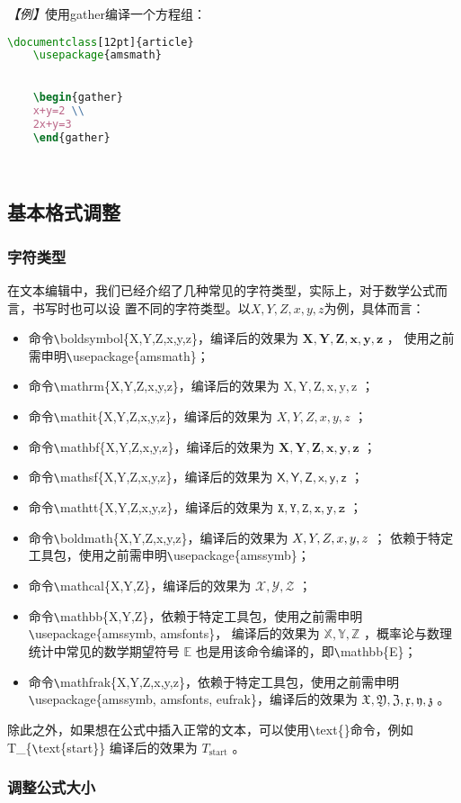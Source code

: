 \emph{【例】}使用gather编译一个方程组：
\begin{lstlisting}[language=TeX]
    \documentclass[12pt]{article}
    \usepackage{amsmath}
    

    \begin{gather}
    x+y=2 \\
    2x+y=3
    \end{gather}

    
\end{lstlisting}

\subsection{基本格式调整}
\subsubsection{字符类型}
在文本编辑中，我们已经介绍了几种常见的字符类型，实际上，对于数学公式而言，书写时也可以设
置不同的字符类型。以$X,Y,Z,x,y,z$为例，具体而言：
\begin{itemize}
    \item 命令\verb|\|boldsymbol\{X,Y,Z,x,y,z\}，编译后的效果为 $\boldsymbol{X,Y,Z,x,y,z}$ ，
          使用之前需申明\verb|\|usepackage\{amsmath\}；
    \item 命令\verb|\|mathrm\{X,Y,Z,x,y,z\}，编译后的效果为 $\mathrm{X,Y,Z,x,y,z}$ ；
    \item 命令\verb|\|mathit\{X,Y,Z,x,y,z\}，编译后的效果为 $\mathit{X,Y,Z,x,y,z}$ ；
    \item 命令\verb|\|mathbf\{X,Y,Z,x,y,z\}，编译后的效果为 $\mathbf{X,Y,Z,x,y,z}$ ；
    \item 命令\verb|\|mathsf\{X,Y,Z,x,y,z\}，编译后的效果为 $\mathsf{X,Y,Z,x,y,z}$ ；
    \item 命令\verb|\|mathtt\{X,Y,Z,x,y,z\}，编译后的效果为 $\mathtt{X,Y,Z,x,y,z}$ ；
    \item 命令\verb|\|boldmath\{X,Y,Z,x,y,z\}，编译后的效果为 $\boldmath{X,Y,Z,x,y,z}$ ；
          依赖于特定工具包，使用之前需申明\verb|\|usepackage\{amssymb\}；
    \item 命令\verb|\|mathcal\{X,Y,Z\}，编译后的效果为 $\mathcal{X,Y,Z}$ ；
    \item 命令\verb|\|mathbb\{X,Y,Z\}，依赖于特定工具包，使用之前需申明\verb|\|usepackage\{amssymb, amsfonts\}，
          编译后的效果为 $\mathbb{X,Y,Z}$ ，概率论与数理统计中常见的数学期望符号 $\mathbb{E}$
          也是用该命令编译的，即\verb|\|mathbb\{E\}；
    \item 命令\verb|\|mathfrak\{X,Y,Z,x,y,z\}，依赖于特定工具包，使用之前需申明
          \verb|\|usepackage\{amssymb, amsfonts, eufrak\}，编译后的效果为 $\mathfrak{X,Y,Z,x,y,z}$ 。
\end{itemize}

除此之外，如果想在公式中插入正常的文本，可以使用\verb|\|text\{\}命令，例如T\_\{\verb|\|text\{start\}\}
编译后的效果为 $T_{\text{start}}$ 。

\subsubsection{调整公式大小}